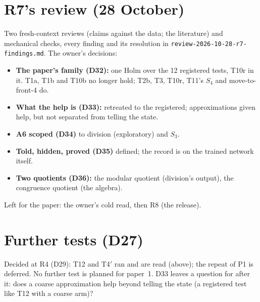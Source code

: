 \documentclass[11pt]{article}
\begin{document}
\section{R7's review (28 October)}
\label{sec:r7}

Two fresh-context reviews (claims against the data; the literature) and mechanical checks, every
finding and its resolution in \texttt{review-2026-10-28-r7-findings.md}. The owner's decisions:
\begin{itemize}
\item \textbf{The paper's family (D32):} one Holm over the 12 registered tests, T10r in it. T1a,
  T1b and T10b no longer hold; T2b, T3, T10r, T11's $S_4$ and move-to-front-4 do.
\item \textbf{What the help is (D33):} retreated to the registered; approximations given help, but
  not separated from telling the state.
\item \textbf{A6 scoped (D34)} to division (exploratory) and $S_3$.
\item \textbf{Told, hidden, proved (D35)} defined; the record is on the trained network itself.
\item \textbf{Two quotients (D36):} the modular quotient (division's output), the congruence
  quotient (the algebra).
\end{itemize}
Left for the paper: the owner's cold read, then R8 (the release).

\section{Further tests (D27)}

Decided at R4 (D29): T12 and T4$'$ ran and are read (above); the repeat of P1 is deferred. No further
test is planned for paper~1. D33 leaves a question for after it: does a coarse approximation
help beyond telling the state (a registered test like T12 with a coarse arm)?
\end{document}
